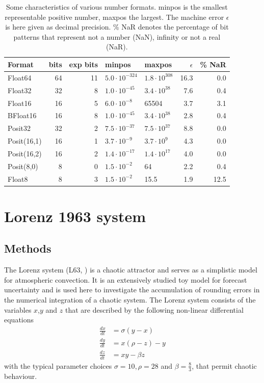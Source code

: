 \documentclass[draft]{agujournal2019}
\begin{document}
\begin{table}
\center
\begin{tabular}{l | r | r | l | l | r | r}
Format & bits & exp bits & minpos & maxpos & $\epsilon$ &  \% NaR \\
\hline
Float64	& 64 & 11 & $5.0 \cdot 10^{-324}$ & $1.8 \cdot 10^{308}$  & 16.3 & 0.0 \\
Float32	& 32 & 8 & $1.0 \cdot 10^{-45}$ & $3.4 \cdot 10^{38}$ & 7.6 & 0.4 \\
Float16	& 16 & 5 & $6.0 \cdot 10^{-8}$ & 65504 & 3.7 & 3.1 \\
BFloat16	& 16 & 8 & $ 1.0 \cdot 10^{-45}$ & $3.4 \cdot 10^{38}$ & 2.8 & 0.4  \\
Posit32	& 32 & 2 &  $7.5 \cdot 10^{-37}$ & $7.5 \cdot 10^{37}$ & 8.8 & 0.0 \\
Posit(16,1) & 16 & 1 & $3.7 \cdot 10^{-9}$ & $3.7 \cdot 10^{9}$ & 4.3 & 0.0\\
Posit(16,2) & 16 & 2 & $1.4 \cdot 10^{-17}$ & $1.4 \cdot 10^{17}$ & 4.0 & 0.0\\
Posit(8,0) & 8 & 0 & $1.5 \cdot 10^{-2}$ & 64 & 2.2 & 0.4  \\
Float8 & 8 & 3 & $1.5 \cdot 10^{-2}$ & 15.5 & 1.9 &12.5\\
\end{tabular}
\vspace{10pt}
\caption{Some characteristics of various number formats. minpos is the smallest representable positive number, maxpos the largest. The machine error $\epsilon$ is here given as decimal precision. \% NaR denotes the percentage of bit patterns that represent not a number (NaN), infinity or not a real (NaR).}
\label{tab:formats}
\end{table}


\section{Lorenz 1963 system}
\label{sec:L63}

\subsection{Methods}
\label{sec:L63_methods}

The Lorenz system (L63, \cite{Lorenz1963}) is a chaotic attractor and serves as a simplistic model for atmospheric convection. It is an extensively studied toy model for forecast uncertainty \cite{Lorenz1963,Kwasniok2014,Jeffress2017,Tantet2018} and is used here to investigate the accumulation of rounding errors in the numerical integration of a chaotic system. The Lorenz system consists of the variables $x$,$y$ and $z$ that are described by the following non-linear differential equations
\begin{subequations}
\begin{align}
\frac{dx}{dt} &= \sigma(y-x) \\
\frac{dy}{dt} &= x(\rho - z) - y \\
\frac{dz}{dt} &= xy - \beta z
\end{align}
\label{eq:L63}%
\end{subequations}
with the typical parameter choices $\sigma = 10, \rho = 28$ and $\beta = \tfrac{8}{3}$, that permit chaotic behaviour. 
\end{document}
